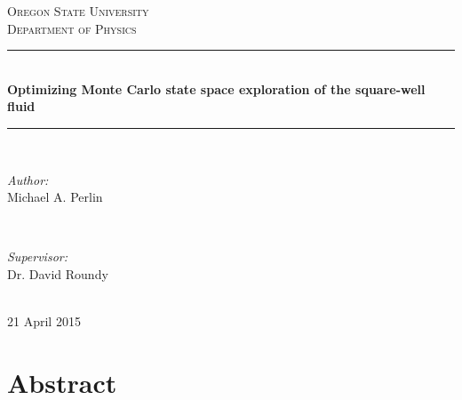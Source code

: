 \documentclass[11pt]{article}
\renewcommand{\title}{Optimizing Monte Carlo state space exploration
  of the square-well fluid}
\renewcommand{\author}{Michael A. Perlin}
\newcommand{\institution}{Oregon State University}
\newcommand{\department}{Department of Physics}
\newcommand{\supervisor}{Dr. David Roundy}
\renewcommand{\date}{21 April 2015}
\begin{document}
\begin{titlepage}

  \newcommand{\HRule}{\rule{\linewidth}{0.5mm}}

  \center

  \textsc{\LARGE \institution}\\[1.5cm]
  \textsc{\Large \department}\\[0.5cm]

  \HRule \\[0.4cm]
  { \huge \bfseries \title}\\[0.4cm]
  \HRule \\[1.5cm]

  \begin{minipage}{0.4\textwidth}
    \begin{flushleft} \large
      \emph{Author:}\\
      \author
    \end{flushleft}
  \end{minipage}
  ~
  \begin{minipage}{0.4\textwidth}
    \begin{flushright} \large
      \emph{Supervisor:} \\
      \supervisor
    \end{flushright}
  \end{minipage}\\[4cm]

  {\large\date}

  \vfill

\end{titlepage}

\thispagestyle{empty}

\newpage

\tableofcontents

\thispagestyle{empty}

\newpage



\thispagestyle{empty}

\newpage

\setcounter{page}{1}


\section*{Abstract}
\label{sec:abstract}
\end{document}

